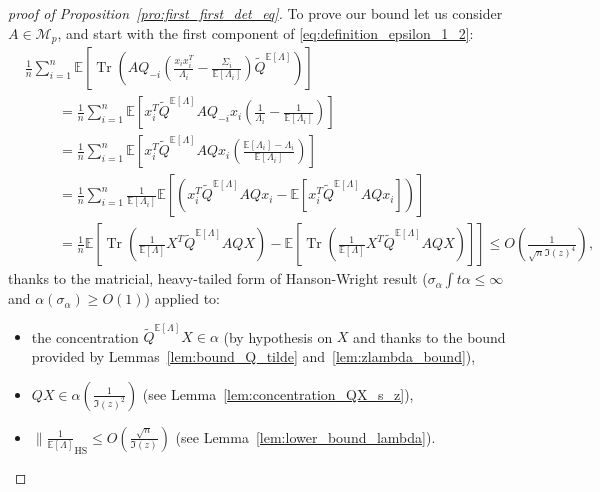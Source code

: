 \documentclass[ECP, preprint]{ejpecp} %
\DeclareMathOperator{\tr}{Tr}
\DeclareMathOperator{\hs}{HS}
\begin{document}
\begin{proof}[proof of Proposition~\ref{pro:first_first_det_eq}]
    To prove our bound let us consider $A\in \mathcal M_p$, and start with the first component of \eqref{eq:definition_epsilon_1_2}:
    \begin{align*}
        &\frac{1}{n}\sum_{i=1}^n  \mathbb{E}\left[\tr  \left( AQ_{-i} \left(\frac{x_ix_i^T}{\Lambda_i} - \frac{\Sigma_i}{\mathbb E[\Lambda_i]}\right)\tilde{Q}^{\mathbb E[\Lambda]} \right)\right]\\
        &\hspace{1cm}= \frac{1}{n}\sum_{i=1}^n  \mathbb{E}\left[x_i^T\tilde{Q}^{\mathbb E[\Lambda]}AQ_{-i} x_i \left(\frac{1}{\Lambda_i} -  \frac{1}{\mathbb E \left[\Lambda_i \right]}\right)\right]\\
        &\hspace{1cm}= \frac{1}{n}\sum_{i=1}^n  \mathbb{E}\left[x_i^T\tilde{Q}^{\mathbb E[\Lambda]}AQ x_i \left(\frac{\mathbb E \left[\Lambda_i \right] - \Lambda_i}{\mathbb E \left[\Lambda_i \right]}\right)\right]\\
        &\hspace{1cm}= \frac{1}{n}\sum_{i=1}^n \frac{1}{\mathbb E[\Lambda_i]} \mathbb{E}\left[\left( x_i^T\tilde{Q}^{\mathbb E[\Lambda]}AQ x_i - \mathbb E \left[ x_i^T\tilde{Q}^{\mathbb E[\Lambda]}AQ x_i \right] \right) \right]\\
        &\hspace{1cm}= \frac{1}{n} \mathbb{E}\left[\tr\left( \frac{1}{\mathbb E[\Lambda]}X^T\tilde{Q}^{\mathbb E[\Lambda]}AQ X\right) - \mathbb E \left[ \tr\left( \frac{1}{\mathbb E[\Lambda]}X^T\tilde{Q}^{\mathbb E[\Lambda]}AQ X\right) \right] \right]
        \leq O \left( \frac{1}{\sqrt{n}\Im(z)^4} \right),
    \end{align*}
    thanks to the matricial, heavy-tailed form of Hanson-Wright result ($\sigma_\alpha \int t\alpha \leq \infty$ and $\alpha(\sigma_\alpha)\geq O(1)$) applied to:
    \begin{itemize}
         \item  the concentration $\tilde Q^{\mathbb E[\Lambda]}X\in \alpha $ (by hypothesis on $X$ and thanks to the bound provided by Lemmas~\ref{lem:bound_Q_tilde} and~\ref{lem:zlambda_bound}),
         \item $QX \in \alpha (\frac{1}{\Im(z)^2})$ (see Lemma~\ref{lem:concentration_QX_s_z}),
         \item $\|\frac{1}{\mathbb E[\Lambda]}_{\hs}\leq O \left( \frac{\sqrt{n}}{\Im(z)} \right)$ (see Lemma~\ref{lem:lower_bound_lambda}).
     \end{itemize}


\end{proof}
\end{document}
